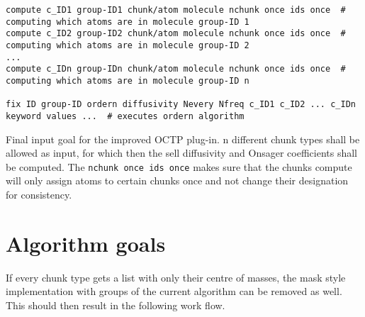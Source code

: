 \documentclass{article-Bram}
\begin{document}
\begin{listing}[ht!]
	\centering
	\begin{verbatim}
compute c_ID1 group-ID1 chunk/atom molecule nchunk once ids once  # computing which atoms are in molecule group-ID 1
compute c_ID2 group-ID2 chunk/atom molecule nchunk once ids once  # computing which atoms are in molecule group-ID 2
...
compute c_IDn group-IDn chunk/atom molecule nchunk once ids once  # computing which atoms are in molecule group-ID n

fix ID group-ID ordern diffusivity Nevery Nfreq c_ID1 c_ID2 ... c_IDn keyword values ...  # executes ordern algorithm
	\end{verbatim}
	\caption{Final input goal for the improved OCTP plug-in. n different chunk types shall be allowed as input, for which then the sell diffusivity and Onsager coefficients shall be computed. The \texttt{nchunk once ids once} makes sure that the chunks compute will only assign atoms to certain chunks once and not change their designation for consistency.}
	\label{intended input}
\end{listing}

\section{Algorithm goals}
If every chunk type gets a list with only their centre of masses, the mask style implementation with groups of the current algorithm can be removed as well. This should then result in the following work flow.



\clearpage
\end{document}
